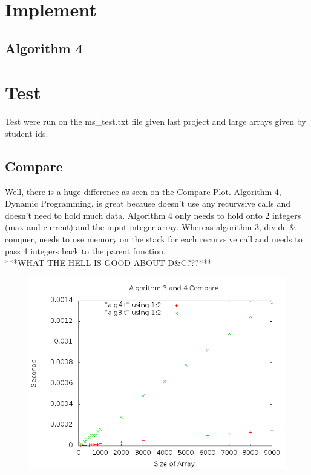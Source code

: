 \documentclass[a4paper,10pt]{article}
\begin{document}
	\section{Implement}
		\subsection{Algorithm 4}
		
	\section{Test}
		Test were run on the ms\_test.txt file given last project and large arrays given by student ids.
\begin{samepage} 
	\section{Compare}
		Well, there is a huge difference as seen on the Compare Plot.
		Algorithm 4, Dynamic Programming, is great because doesn't use any recurvsive calls and doesn't need to hold much data.
		Algorithm 4 only needs to hold onto 2 integers (max and current) and the input integer array.  
		Whereas algorithm 3, divide \& conquer, needs to use memory on the stack for each recurvsive call and needs to pass 4 integers back to the parent function.\\
		***WHAT THE HELL IS GOOD ABOUT D\&C???***
		\begin{figure}[!htb]
			\centering
			\includegraphics[scale=.5]{timingfiles/algCompareplot.png}
		\end{figure}
\end{samepage} 

		
		
\end{document}
